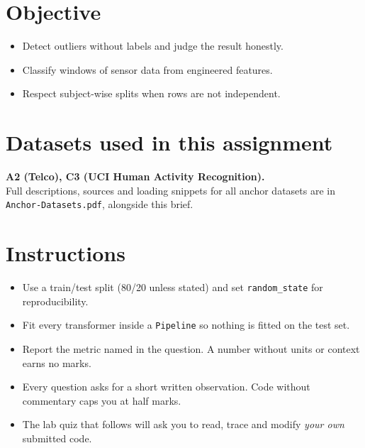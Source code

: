 \documentclass[11pt,a4paper]{article}
\begin{document}

\section*{Objective}

\begin{itemize}[leftmargin=*]

  \item Detect outliers without labels and judge the result honestly.

  \item Classify windows of sensor data from engineered features.

  \item Respect subject-wise splits when rows are not independent.

\end{itemize}

\section*{Datasets used in this assignment}

\textbf{A2 (Telco), C3 (UCI Human Activity Recognition).}\\ Full descriptions, sources and loading snippets for all anchor datasets are in \texttt{Anchor-Datasets.pdf}, alongside this brief.

\section*{Instructions}

\begin{itemize}[leftmargin=*]

  \item Use a train/test split (80/20 unless stated) and set \texttt{random\_state} for reproducibility.

  \item Fit every transformer inside a \texttt{Pipeline} so nothing is fitted on the test set.

  \item Report the metric named in the question. A number without units or context earns no marks.

  \item Every question asks for a short written observation. Code without commentary caps you at half marks.

  \item The lab quiz that follows will ask you to read, trace and modify \emph{your own} submitted code.

\end{itemize}
\end{document}
